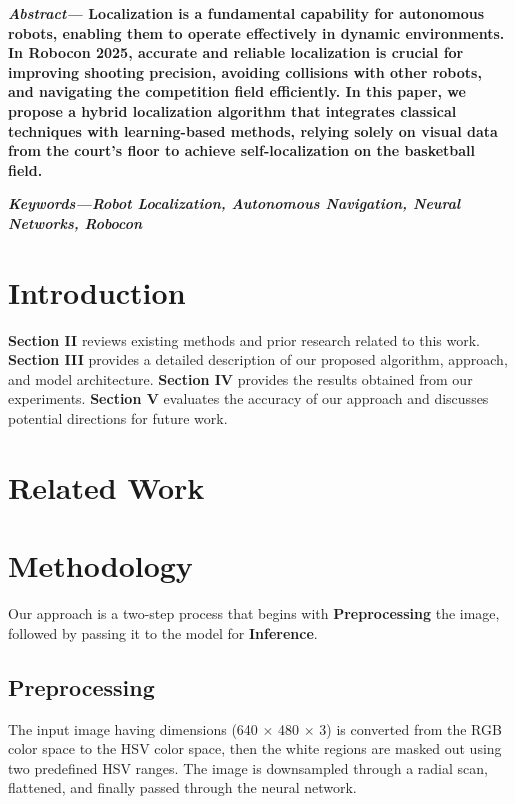 \documentclass[a4paper]{article}
\begin{document}
\begin{multicols}{2}
\setlength{\columnsep}{0.5cm}

\noindent \textbf{\textit{Abstract---}
Localization is a fundamental capability for autonomous robots, enabling them 
to operate effectively in dynamic environments. In Robocon 2025, accurate and 
reliable localization is crucial for improving shooting precision, avoiding 
collisions with other robots, and navigating the competition field efficiently. 
In this paper, we propose a hybrid localization algorithm that integrates classical 
techniques with learning-based methods, relying solely on visual data from the court’s
floor to achieve self-localization on the basketball field.
}

\small	
\noindent \textbf{
  \textit{Keywords---}\textit{Robot Localization, Autonomous Navigation, Neural Networks, Robocon}}

\section{Introduction}
\par \noindent
\textbf{Section II} reviews existing methods and prior research related to this work. 
\textbf{Section III} provides a detailed description of our proposed algorithm, approach, and model architecture. 
\textbf{Section IV} provides the results obtained from our experiments. 
\textbf{Section V} evaluates the accuracy of our approach and discusses potential directions for future work.


\section{Related Work}
\section{Methodology}
\par \noindent Our approach is a two-step process that begins with \textbf{Preprocessing} the image,
followed by passing it to the model for \textbf{Inference}.
\subsection{Preprocessing}
\par \noindent The input image having dimensions (640 $\times$ 480 $\times$ 3) is converted from the RGB color space to the HSV color space, then the white regions are masked out using two predefined HSV ranges.
The image is downsampled through a radial scan, flattened, and finally passed through the neural network.


\end{multicols}
\end{document}
